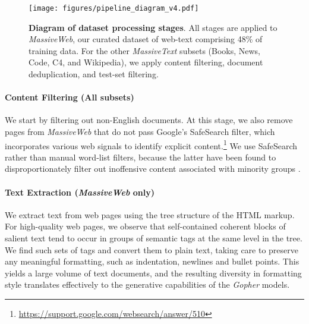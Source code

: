 \documentclass[11pt, a4paper, logo, internal, copyright, nonumbering]{deepmind}
\newcommand{\massivetext}{\textit{MassiveText}\xspace}
\newcommand{\massiveweb}{\textit{MassiveWeb}\xspace}
\newcommand{\gopher}{\textit{Gopher}\xspace}
\begin{document}
\begin{figure}[h]
    \centering
    \texttt{[image: figures/pipeline\_diagram\_v4.pdf]}
    \caption{\textbf{Diagram of dataset processing stages}. All stages are applied to \massiveweb, our curated dataset of web-text comprising 48\% of training data. For the other \massivetext subsets (Books, News, Code, C4, and Wikipedia), we apply content filtering, document deduplication, and test-set filtering. }
    \label{fig:massiveweb_data_pipeline_diagram}
\end{figure}


\paragraph{Content Filtering (All subsets)}
We start by filtering out non-English documents. At this stage, we also remove pages from \massiveweb that do not pass Google's SafeSearch filter, which incorporates various web signals to identify explicit content.\footnote{\url{https://support.google.com/websearch/answer/510}} We use SafeSearch rather than manual word-list filters, because the latter have been found to disproportionately filter out inoffensive content associated with minority groups \citep{dodge2021documenting}.

\paragraph{Text Extraction (\massiveweb only)}
\label{massive-web-scraper} We extract text from web pages using the tree structure of the HTML markup. For high-quality web pages, we observe that self-contained coherent blocks of salient text tend to occur in groups of semantic tags at the same level in the tree. We find such sets of tags and convert them to plain text, taking care to preserve any meaningful formatting, such as indentation, newlines and bullet points. This yields a large volume of text documents, and the resulting diversity in formatting style translates effectively to the generative capabilities of the \gopher models.
\end{document}

